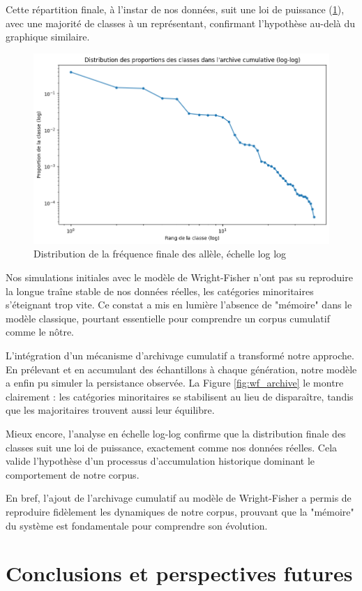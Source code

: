 \documentclass[12pt,a4paper,oneside,titlepage]{book} %
\begin{document}
Cette répartition finale, à l'instar de nos données, suit une loi de puissance (\ref{fig:loglog_archive}), avec une majorité de classes à un représentant, confirmant l'hypothèse au-delà du graphique similaire.
\begin{figure}
    \centering
    \includegraphics[width=0.5\linewidth]{illustration/loglog_archive.png}
    \caption{Distribution de la fréquence finale des allèle, échelle log log}
    \label{fig:loglog_archive}
\end{figure}


Nos simulations initiales avec le modèle de Wright-Fisher n'ont pas su reproduire la longue traîne stable de nos données réelles, les catégories minoritaires s'éteignant trop vite. Ce constat a mis en lumière l'absence de "mémoire" dans le modèle classique, pourtant essentielle pour comprendre un corpus cumulatif comme le nôtre.

L'intégration d'un mécanisme d'archivage cumulatif a transformé notre approche. En prélevant et en accumulant des échantillons à chaque génération, notre modèle a enfin pu simuler la persistance observée. La Figure \ref{fig:wf_archive} le montre clairement : les catégories minoritaires se stabilisent au lieu de disparaître, tandis que les majoritaires trouvent aussi leur équilibre.

Mieux encore, l'analyse en échelle log-log confirme que la distribution finale des classes suit une loi de puissance, exactement comme nos données réelles. Cela valide l'hypothèse d'un processus d'accumulation historique dominant le comportement de notre corpus.

En bref, l'ajout de l'archivage cumulatif au modèle de Wright-Fisher a permis de reproduire fidèlement les dynamiques de notre corpus, prouvant que la "mémoire" du système est fondamentale pour comprendre son évolution.

\part*{Conclusions et perspectives futures}
\end{document}
